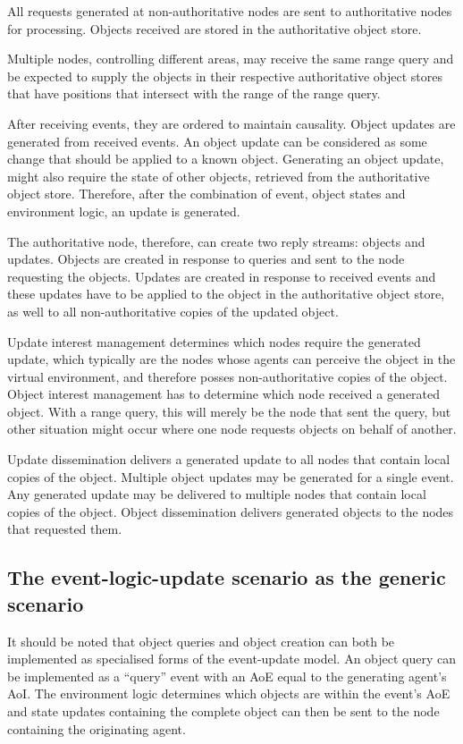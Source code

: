 All requests generated at non-authoritative nodes are sent to authoritative nodes for processing. Objects received are stored in the authoritative object store.

Multiple nodes, controlling different areas, may receive the same range query and be expected to supply the objects in their respective authoritative object stores that have positions that intersect with the range of the range query.

After receiving events, they are ordered to maintain causality. Object updates are generated from received events. An object update can be considered as some change that should be applied to a known object. Generating an object update, might also require the state of other objects, retrieved from the authoritative object store. Therefore, after the combination of event, object states and environment logic, an update is generated.

The authoritative node, therefore, can create two reply streams: objects and updates. Objects are created in response to queries and sent to the node requesting the objects. Updates are created in response to received events and these updates have to be applied to the object in the authoritative object store, as well to all non-authoritative copies of the updated object.

Update interest management determines which nodes require the generated update, which typically are the nodes whose agents can perceive the object in the virtual environment, and therefore posses non-authoritative copies of the object. Object interest management has to determine which node received a generated object. With a range query, this will merely be the node that sent the query, but other situation might occur where one node requests objects on behalf of another.

Update dissemination delivers a generated update to all nodes that contain local copies of the object. Multiple object updates may be generated for a single event. Any generated update may be delivered to multiple nodes that contain local copies of the object. Object dissemination delivers generated objects to the nodes that requested them.

\subsection{The event-logic-update scenario as the generic scenario}

It should be noted that object queries and object creation can both be implemented as specialised forms of the event-update model. An object query can be implemented as a ``query'' event with an AoE equal to the generating agent's AoI. The environment logic determines which objects are within the event's AoE and state updates containing the complete object can then be sent to the node containing the originating agent.

